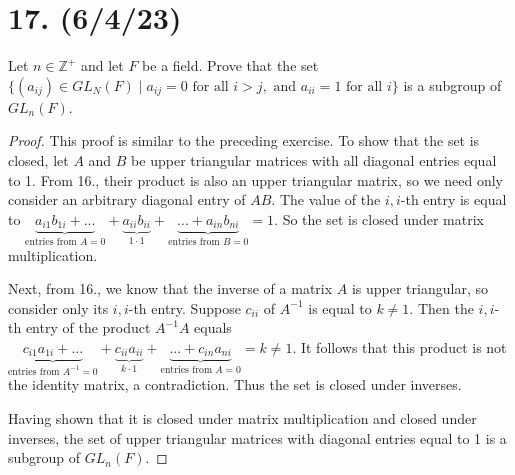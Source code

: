 \documentclass{article}
\begin{document}
\section*{17. (6/4/23)}

Let $n \in \mathbb{Z}^+$ and let $F$ be a field. Prove that the set $\{ (a_{ij}) \in GL_N(F) \mid a_{ij} = 0 \text{ for all } i > j, \text{ and } a_{ii} = 1 \text{ for all } i \}$ is a subgroup of $GL_n(F)$.

\begin{proof}
    This proof is similar to the preceding exercise. To show that the set is closed, let $A$ and $B$ be upper triangular matrices with all diagonal entries equal to 1. From 16., their product is also an upper triangular matrix, so we need only consider an arbitrary diagonal entry of $AB$. The value of the $i,i$-th entry is equal to $\underbrace{a_{i1}b_{1i} + ...}_{\text{entries from } A = 0} + \underbrace{a_{ii}b_{ii}}_{1 \cdot 1} + \underbrace{... + a_{in}b_{ni}}_{\text{entries from } B = 0} = 1$. So the set is closed under matrix multiplication.

    Next, from 16., we know that the inverse of a matrix $A$ is upper triangular, so consider only its $i,i$-th entry. Suppose $c_{ii}$ of $A^{-1}$ is equal to $k \neq 1$. Then the $i,i$-th entry of the product $A^{-1}A$ equals $\underbrace{c_{i1}a_{1i} + ...}_{\text{entries from } A^{-1} = 0} + \underbrace{c_{ii}a_{ii}}_{k \cdot 1} + \underbrace{... + c_{in}a_{ni}}_{\text{entries from } A = 0} = k \neq 1$. It follows that this product is not the identity matrix, a contradiction. Thus the set is closed under inverses.

    Having shown that it is closed under matrix multiplication and closed under inverses, the set of upper triangular matrices with diagonal entries equal to 1 is a subgroup of $GL_n(F)$.    
\end{proof}
\end{document}
